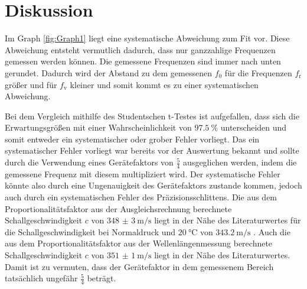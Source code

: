 
\section{Diskussion}
\label{sec:Diskussion}



Im Graph \ref{fig:Graph1} liegt eine systematische Abweichung zum Fit vor. Diese Abweichung entsteht vermutlich dadurch, dass nur ganzzahlige Frequenzen gemessen werden können. Die gemessene Frequenzen sind immer nach unten gerundet. Dadurch wird der Abstand zu dem gemessenen $f_0$ für die Frequenzen $f_\text{r}$ größer und für $f_\text{v}$ kleiner und somit kommt es zu einer systematischen Abweichung.


Bei dem Vergleich mithilfe des Studentschen t-Testes ist aufgefallen, dass sich die Erwartungsgrößen mit einer Wahrscheinlichkeit von $\SI{97.5}{\percent}$ unterscheiden und somit entweder ein systematischer oder grober Fehler vorliegt. Das ein systematischer Fehler vorliegt war bereits vor der Auswertung bekannt und sollte durch die Verwendung eines Gerätefaktors von $\frac{5}{4}$ ausgeglichen werden, indem die gemessene Frequenz mit diesem multipliziert wird. Der systematische Fehler könnte also durch eine Ungenauigkeit des Gerätefaktors zustande kommen, jedoch auch durch ein systematischen Fehler des Präzisionsschlittens.
Die aus dem Proportionalitätsfaktor aus der Ausgleichsrechnung berechnete Schallgeschwindigkeit $c$ von $\SI{348(3)}{\meter\per\second}$ liegt in der Nähe des Literaturwertes für die Schallgeschwindigkeit bei Normaldruck und $\SI{20}{\celsius}$ von $\SI{343.2}{\meter\per\second}$ \cite{c}. Auch die aus dem Proportionalitätsfaktor aus der Wellenlängenmessung berechnete Schallgeschwindigkeit $c$ von $\SI{351(1)}{\meter\per\second}$ liegt in der Nähe des Literaturwertes. Damit ist zu vermuten, dass der Gerätefaktor in dem gemessenem Bereich tatsächlich ungefähr $\frac{5}{4}$ beträgt.





